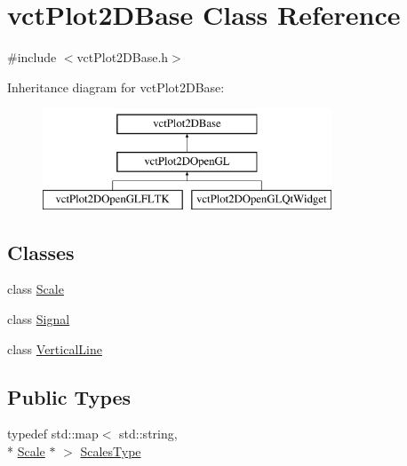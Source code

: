 \hypertarget{classvct_plot2_d_base}{\section{vct\-Plot2\-D\-Base Class Reference}
\label{classvct_plot2_d_base}
}


{\ttfamily \#include $<$vct\-Plot2\-D\-Base.\-h$>$}

Inheritance diagram for vct\-Plot2\-D\-Base\-:\begin{figure}[H]
\begin{center}
\leavevmode
\includegraphics[height=3.000000cm]{d8/d91/classvct_plot2_d_base}
\end{center}
\end{figure}
\subsection*{Classes}
\begin{DoxyCompactItemize}
\item 
class \hyperlink{classvct_plot2_d_base_1_1_scale}{Scale}
\item 
class \hyperlink{classvct_plot2_d_base_1_1_signal}{Signal}
\item 
class \hyperlink{classvct_plot2_d_base_1_1_vertical_line}{Vertical\-Line}
\end{DoxyCompactItemize}
\subsection*{Public Types}
\begin{DoxyCompactItemize}
\item 
typedef std\-::map$<$ std\-::string, \\*
\hyperlink{classvct_plot2_d_base_1_1_scale}{Scale} $\ast$ $>$ \hyperlink{classvct_plot2_d_base_a0f7274ebd354a06e7102b164f60b7d94}{Scales\-Type}
\end{DoxyCompactItemize}
